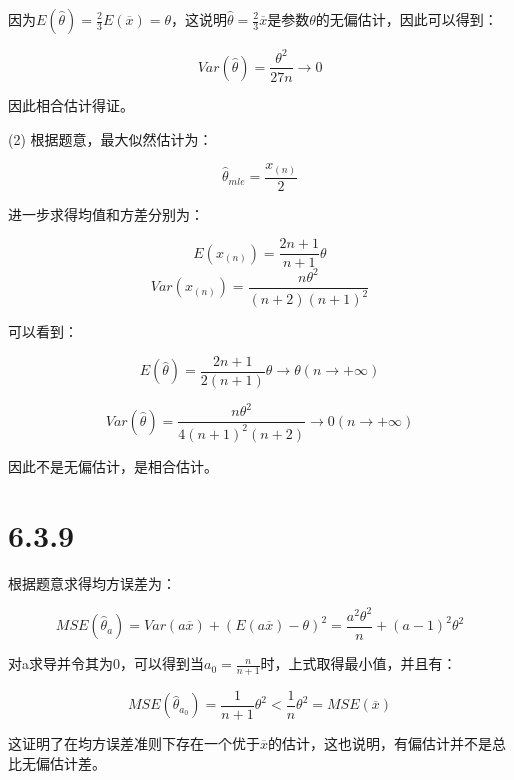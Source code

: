 \documentclass{article}
\begin{document}
因为$E(\hat \theta)=\frac23E(\overline x)=\theta$，这说明$\hat \theta = \frac23\overline x$是参数$\theta$的无偏估计，因此可以得到：

$$Var(\hat \theta)=\frac{\theta^2}{27n}\rightarrow 0$$

因此相合估计得证。

(2)
根据题意，最大似然估计为：

$$\hat \theta_{mle}=\frac{x_{(n)}}2$$

进一步求得均值和方差分别为：

$$E(x_{(n)})=\frac{2n+1}{n+1}\theta$$
$$Var(x_{(n)})=\frac{n\theta^2}{(n+2)(n+1)^2}$$

可以看到：

$$E(\hat \theta)=\frac{2n+1}{2(n+1)}\theta\rightarrow\theta(n\rightarrow+\infty)$$

$$Var(\hat\theta)=\frac{n\theta^2}{4(n+1)^2(n+2)}\rightarrow0(n\rightarrow+\infty)$$

因此不是无偏估计，是相合估计。

\section{6.3.9}

根据题意求得均方误差为：

$$MSE(\hat\theta_a)=Var(a\overline x)+(E(a\overline x)-\theta)^2=\frac{a^2\theta^2}{n}+(a-1)^2\theta^2$$

对a求导并令其为0，可以得到当$a_0=\frac{n}{n+1}$时，上式取得最小值，并且有：

$$MSE(\hat\theta_{a_0})=\frac1{n+1}\theta^2<\frac1n\theta^2=MSE(\overline x)$$

这证明了在均方误差准则下存在一个优于$\overline x$的估计，这也说明，有偏估计并不是总比无偏估计差。
\end{document}
